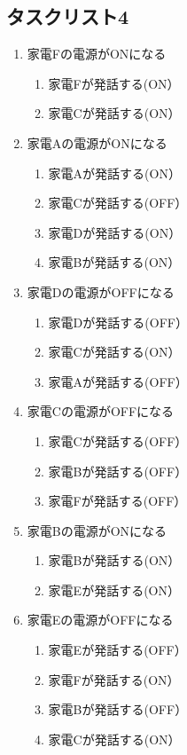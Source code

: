 \documentclass[a4j,12pt,twoside]{jreport}
\begin{document}
\subsection*{タスクリスト4}
\begin{multicols}{2}
	\begin{enumerate}
		\item 家電Fの電源がONになる
		\begin{enumerate}
			\item 家電Fが発話する(ON）
			\item 家電Cが発話する(ON）
		\end{enumerate}
		
		\item 家電Aの電源がONになる
		\begin{enumerate}
			\item 家電Aが発話する(ON）
			\item 家電Cが発話する(OFF）
			\item 家電Dが発話する(ON）
			\item 家電Bが発話する(ON）
		\end{enumerate}	
			
		\item 家電Dの電源がOFFになる
		\begin{enumerate}
			\item 家電Dが発話する(OFF）
			\item 家電Cが発話する(ON）
			\item 家電Aが発話する(OFF）
		\end{enumerate}
	
		\item 家電Cの電源がOFFになる
		\begin{enumerate}	
			\item 家電Cが発話する(OFF）	
			\item 家電Bが発話する(OFF）
			\item 家電Fが発話する(OFF）
		\end{enumerate}
		
		\item 家電Bの電源がONになる
		\begin{enumerate}	
			\item 家電Bが発話する(ON）
			\item 家電Eが発話する(ON）
		\end{enumerate}	
		
		\item 家電Eの電源がOFFになる
		\begin{enumerate}
			\item 家電Eが発話する(OFF）
			\item 家電Fが発話する(ON）
			\item 家電Bが発話する(OFF）
			\item 家電Cが発話する(ON）	
		\end{enumerate}	
		

\end{enumerate}
\end{multicols}
\end{document}
